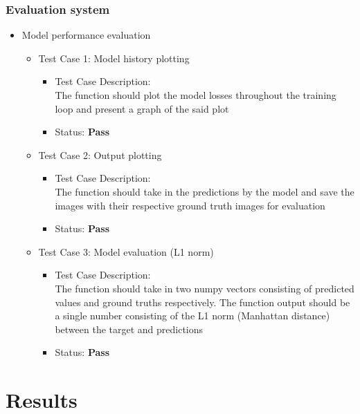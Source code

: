 \documentclass[oneside,a4paper,12pt]{report}
\begin{document}
\subsection{Evaluation system}
\begin{itemize}
	\item Model performance evaluation
	\begin{itemize}
		\item Test Case 1: Model history plotting
		\begin{itemize}
			\item Test Case Description:\\
			The function should plot the model losses throughout the training loop and present a graph of the said plot
			\item Status: \textbf{Pass}
		\end{itemize}
		\item Test Case 2: Output plotting
		\begin{itemize}
			\item Test Case Description:\\
			The function should take in the predictions by the model and save the images with their respective ground truth images for evaluation
			\item Status: \textbf{Pass}
		\end{itemize}
		\item Test Case 3: Model evaluation (L1 norm)
		\begin{itemize}
			\item Test Case Description:\\
			The function should take in two numpy vectors consisting of predicted values and ground truths respectively. The function output should be a single number consisting of the L1 norm (Manhattan distance) between the target and predictions
			\item Status: \textbf{Pass}
		\end{itemize}
	\end{itemize}
\end{itemize}


\chapter{Results}
\end{document}
